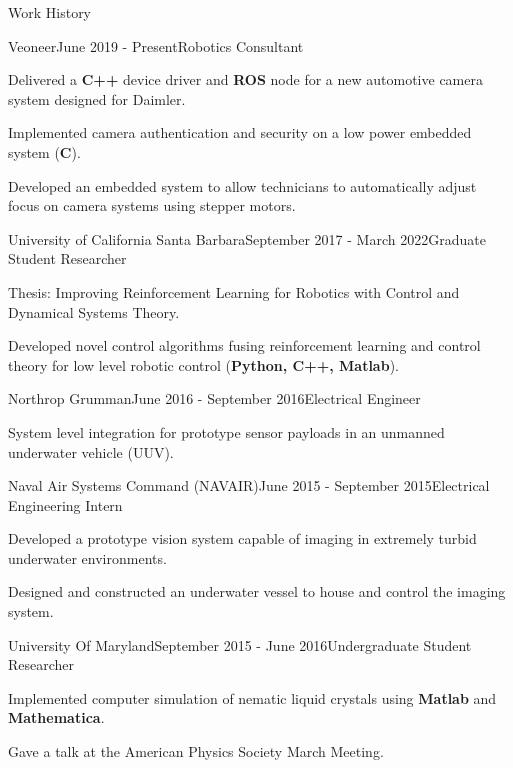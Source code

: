 \documentclass{resume} %
\begin{document}
\begin{rSection}{Work History}

  
\begin{rSubsection}{Veoneer}{June 2019 - Present}{Robotics Consultant}{}
\item Delivered a \textbf{C++} device driver and \textbf{ROS} node for a new automotive camera system designed for Daimler.
\item Implemented camera authentication and security on a low power embedded system (\textbf{C}).
\item Developed an embedded system to allow technicians to automatically adjust focus on camera systems using stepper motors.
\end{rSubsection}

\begin{rSubsection}{University of California Santa Barbara}{September 2017 - March 2022}{Graduate Student Researcher}{}
\item Thesis: Improving Reinforcement Learning for Robotics with Control and Dynamical Systems Theory.
\item Developed novel control algorithms fusing reinforcement learning and control theory for low level robotic control (\textbf{Python, C++, Matlab}).
\end{rSubsection}

  
\begin{rSubsection}{Northrop Grumman}{June 2016 - September 2016}{Electrical Engineer}{}
\item System level integration for prototype sensor payloads in an unmanned underwater vehicle (UUV).
\end{rSubsection}

\begin{rSubsection}{Naval Air Systems Command (NAVAIR)}{June 2015 - September 2015}{Electrical Engineering Intern}{}
\item Developed a prototype vision system capable of imaging in extremely turbid underwater environments.
\item Designed and constructed an underwater vessel to house and control the imaging system.
\end{rSubsection}

\begin{rSubsection}{University Of Maryland}{September 2015 - June 2016}{Undergraduate Student Researcher}{}
\item Implemented computer simulation of nematic liquid crystals using \textbf{Matlab} and \textbf{Mathematica}.
\item Gave a talk at the American Physics Society March Meeting. 
\end{rSubsection}


\end{rSection}
\end{document}
